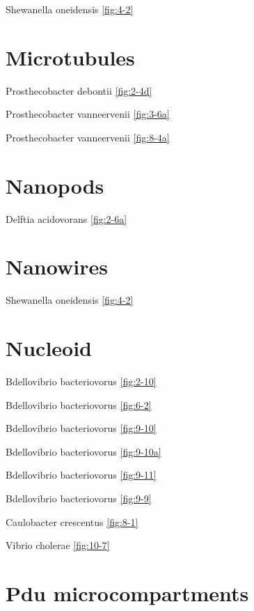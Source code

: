 \documentclass[]{tufte-book}
\begin{document}
Shewanella oneidensis \ref{fig:4-2}

\hypertarget{microtubules}{%
\section*{Microtubules}\label{microtubules}}

Prosthecobacter debontii \ref{fig:2-4d}

Prosthecobacter vanneervenii \ref{fig:3-6a}

Prosthecobacter vanneervenii \ref{fig:8-4a}

\hypertarget{nanopods}{%
\section*{Nanopods}\label{nanopods}}

Delftia acidovorans \ref{fig:2-6a}

\hypertarget{nanowires}{%
\section*{Nanowires}\label{nanowires}}

Shewanella oneidensis \ref{fig:4-2}

\hypertarget{nucleoid-1}{%
\section*{Nucleoid}\label{nucleoid-1}}

Bdellovibrio bacteriovorus \ref{fig:2-10}

Bdellovibrio bacteriovorus \ref{fig:6-2}

Bdellovibrio bacteriovorus \ref{fig:9-10}

Bdellovibrio bacteriovorus \ref{fig:9-10a}

Bdellovibrio bacteriovorus \ref{fig:9-11}

Bdellovibrio bacteriovorus \ref{fig:9-9}

Caulobacter crescentus \ref{fig:8-1}

Vibrio cholerae \ref{fig:10-7}

\hypertarget{pdu-microcompartments}{%
\section*{Pdu microcompartments}\label{pdu-microcompartments}}
\end{document}
